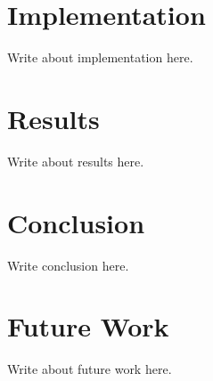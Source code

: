 \documentclass[conference]{acmsiggraph}
\begin{document}
\section{Implementation}

Write about implementation here.

\section{Results}

Write about results here.

\section{Conclusion}

Write conclusion here.

\section{Future Work}

Write about future work here.



\end{document}
